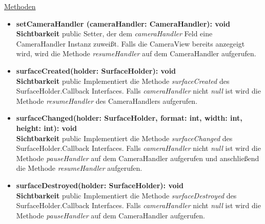 \underline{Methoden}
\begin{itemize}
\itemsep0pt

\item \textbf{setCameraHandler (cameraHandler: CameraHandler): void}\hfill\\
\textbf{Sichtbarkeit} public\newline
Setter, der dem \textit{cameraHandler} Feld eine CameraHandler Instanz zuweißt. Falls die CameraView bereits anzegeigt wird, wird die Methode \textit{resumeHandler} auf dem CameraHandler aufgerufen.

\item \textbf{surfaceCreated(holder: SurfaceHolder): void}\hfill\\
\textbf{Sichtbarkeit} public\newline
Implementiert die Methode \textit{surfaceCreated} des SurfaceHolder.Callback Interfaces. Falls \textit{cameraHandler} nicht \textit{null} ist wird die Methode \textit{resumeHandler} des CameraHandlers aufgerufen.

\item \textbf{surfaceChanged(holder: SurfaceHolder, format: int, width: int, height: int): void}\hfill\\
\textbf{Sichtbarkeit} public\newline
Implementiert die Methode \textit{surfaceChanged} des SurfaceHolder.Callback Interfaces. Falls \textit{cameraHandler} nicht \textit{null} ist wird die Methode \textit{pauseHandler} auf dem CameraHandler aufgerufen und anschließend die Methode \textit{resumeHandler} aufgerufen.

\item \textbf{surfaceDestroyed(holder: SurfaceHolder): void}\hfill\\
\textbf{Sichtbarkeit} public\newline
Implementiert die Methode \textit{surfaceDestroyed} des SurfaceHolder.Callback Interfaces. Falls \textit{cameraHandler} nicht \textit{null} ist wird die Methode \textit{pauseHandler} auf dem CameraHandler aufgerufen.

\end{itemize}